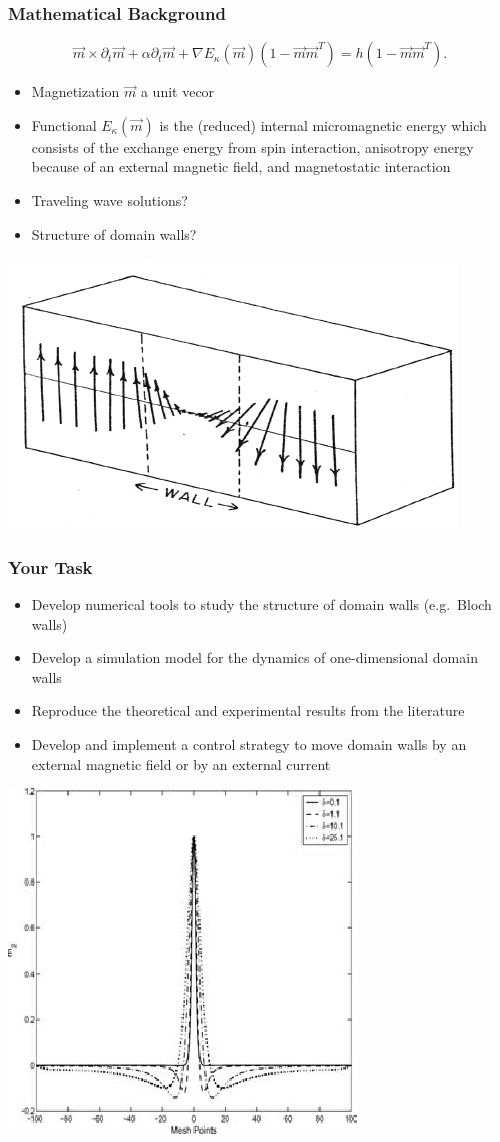 \documentclass{rwth-beamer}
\begin{document}
			\begin{frame}[c]
		\frametitle{Mathematical Background}
\begin{block}{}
$$
\vec{m}\times\partial_t \vec{m}+\alpha \partial_t \vec{m}+\nabla E_\kappa(\vec{m})(1-\vec{m}\vec{m}^T) = h(1-\vec{m}\vec{m}^T).
$$
\end{block}
		\begin{itemize}
		\item Magnetization $\vec{m}$ a unit vecor
		\item Functional $E_\kappa(\vec{m})$ is the (reduced) internal micromagnetic energy which consists of
the exchange energy from spin interaction, anisotropy energy because of an external magnetic field, and magnetostatic interaction
		\item Traveling wave solutions?
		\item Structure of domain walls?
		\end{itemize}
\begin{center}
\includegraphics[width=0.4\linewidth]{../figs/BlochWall}
\end{center}
	\end{frame}


	\begin{frame}[c]
		\frametitle{Your Task}
\begin{itemize}
\item Develop numerical tools to study the structure of domain walls (e.g.\ Bloch walls)
\item Develop a simulation model for the dynamics of one-dimensional domain walls
\item Reproduce the theoretical and experimental results from the literature
\item Develop and implement a control strategy to move domain walls by an external magnetic field or by an external current
\end{itemize}				
\begin{center}
\includegraphics[width=0.3\linewidth]{../figs/Bloch}
\end{center}
	\end{frame}


	
\end{document}
